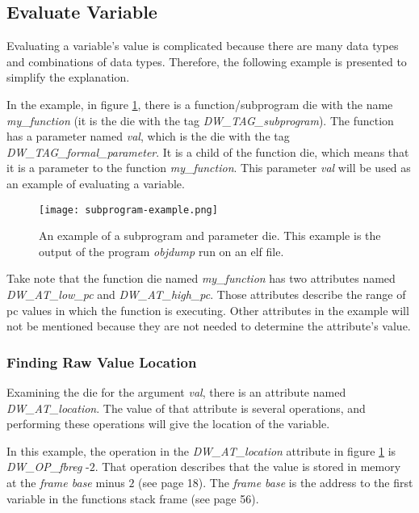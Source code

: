 \subsection{Evaluate Variable}
\label{sec:evaluate-variable}
Evaluating a variable's value is complicated because there are many data types and combinations of data types.
Therefore, the following example is presented to simplify the explanation.


In the example, in figure \ref{fig:subprogramexample}, there is a function/subprogram \gls{die} with the name \emph{my\_function} (it is the \gls{die} with the tag \emph{DW\_TAG\_subprogram}).
The function has a parameter named \emph{val}, which is the \gls{die} with the tag \emph{DW\_TAG\_formal\_parameter}.
It is a child of the function \gls{die}, which means that it is a parameter to the function \emph{my\_function}.
This parameter \emph{val} will be used as an example of evaluating a variable.


\begin{figure}[h]
	\centering
	\texttt{[image: subprogram-example.png]}
	\caption{An example of a subprogram and parameter \gls{die}. This example is the output of the program \emph{objdump} run on an \gls{elf} file.}
	\label{fig:subprogramexample}
\end{figure}


Take note that the function \gls{die} named \emph{my\_function} has two attributes named \emph{DW\_AT\_low\_pc} and \emph{DW\_AT\_high\_pc}.
Those attributes describe the range of \gls{pc} values in which the function is executing.
Other attributes in the example will not be mentioned because they are not needed to determine the attribute's value.


\subsubsection{Finding Raw Value Location}
Examining the \gls{die} for the argument \emph{val}, there is an attribute named \emph{DW\_AT\_location}.
The value of that attribute is several operations, and performing these operations will give the location of the variable.


In this example, the operation in the \emph{DW\_AT\_location} attribute in figure \ref{fig:subprogramexample} is \emph{DW\_OP\_fbreg} -$2$.
That operation describes that the value is stored in memory at the \emph{frame base} minus $2$ (see \cite{dwarf} page 18).
The \emph{frame base} is the address to the first variable in the functions stack frame (see \cite{dwarf} page 56).


